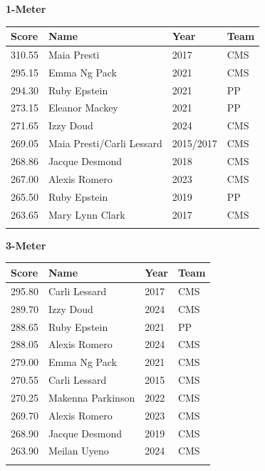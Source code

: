 \vspace{1.2em}
\noindent\begin{minipage}[t]{0.98\textwidth}
\centering
\textbf{\textcolor{teamprimary}{1-Meter}}\par
\vspace{0.5em}
\centering
\small
\renewcommand{\arraystretch}{1.0}
\setlength{\tabcolsep}{4pt}
\begin{tabular}{@{}p{2.5cm}p{4.5cm}p{1.5cm}p{2.5cm}@{}}
\toprule
\textbf{Score} & \textbf{Name} & \textbf{Year} & \textbf{Team} \\
\midrule
310.55 & Maia Presti & 2017 & CMS \\
295.15 & Emma Ng Pack & 2021 & CMS \\
294.30 & Ruby Epstein & 2021 & PP \\
273.15 & Eleanor Mackey & 2021 & PP \\
271.65 & Izzy Doud & 2024 & CMS \\
269.05 & Maia Presti/Carli Lessard & 2015/2017 & CMS \\
268.86 & Jacque Desmond & 2018 & CMS \\
267.00 & Alexis Romero & 2023 & CMS \\
265.50 & Ruby Epstein & 2019 & PP \\
263.65 & Mary Lynn Clark & 2017 & CMS \\
\bottomrule
\vspace{0.5em}
\end{tabular}
\end{minipage}
\vspace{1.2em}
\noindent\begin{minipage}[t]{0.98\textwidth}
\centering
\textbf{\textcolor{teamprimary}{3-Meter}}\par
\vspace{0.5em}
\centering
\small
\renewcommand{\arraystretch}{1.0}
\setlength{\tabcolsep}{4pt}
\begin{tabular}{@{}p{2.5cm}p{4.5cm}p{1.5cm}p{2.5cm}@{}}
\toprule
\textbf{Score} & \textbf{Name} & \textbf{Year} & \textbf{Team} \\
\midrule
295.80 & Carli Lessard & 2017 & CMS \\
289.70 & Izzy Doud & 2024 & CMS \\
288.65 & Ruby Epstein & 2021 & PP \\
288.05 & Alexis Romero & 2024 & CMS \\
279.00 & Emma Ng Pack & 2021 & CMS \\
270.55 & Carli Lessard & 2015 & CMS \\
270.25 & Makenna Parkinson & 2022 & CMS \\
269.70 & Alexis Romero & 2023 & CMS \\
268.90 & Jacque Desmond & 2019 & CMS \\
263.90 & Meilan Uyeno & 2024 & CMS \\
\bottomrule
\vspace{0.5em}
\end{tabular}
\end{minipage}
\clearpage
